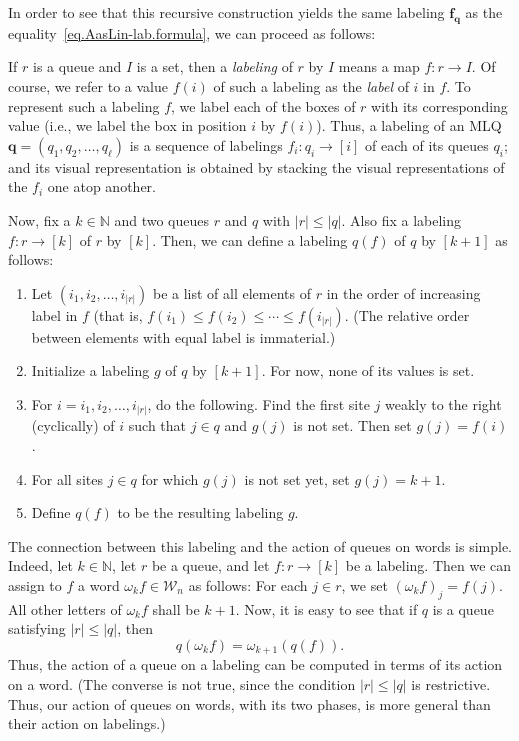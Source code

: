 \documentclass[reqno]{amsart}
\newcommand{\0}{\phantom{c}}
\newcommand{\ff}{\mathbf{f}}
\newcommand{\qq}{\mathbf{q}}
\newcommand{\mcW}{\mathcal{W}}
\newcommand{\NN}{\mathbb{N}}
\newenvironment{verlong}{}{}
\newcommand{\abs}[1]{\left| #1 \right|}
\newcommand{\tup}[1]{\left( #1 \right)}
\newcommand{\ive}[1]{\left[ #1 \right]}
\newcommand{\defn}[1]{{\color{darkred}\emph{#1}}} %
\theoremstyle{plain}
\theoremstyle{definition}
\numberwithin{equation}{section}
\begin{document}
\begin{verlong}
In order to see that this recursive construction yields the same labeling $\ff_\qq$ as the equality~\eqref{eq.AasLin-lab.formula}, we can proceed as follows:

If $r$ is a queue and $I$ is a set, then a \defn{labeling} of $r$ by $I$ means a map $f \colon r \to I$.
Of course, we refer to a value $f \tup{i}$ of such a labeling as the \defn{label} of $i$ in $f$.
To represent such a labeling $f$, we label each of the boxes of $r$ with its corresponding value (i.e., we label the box in position $i$ by $f\tup{i}$).
Thus, a labeling of an MLQ $\qq = (q_1, q_2, \dotsc, q_{\ell})$ is a sequence of labelings $f_i \colon q_i \to \ive{i}$ of each of its queues $q_i$; and its visual representation is obtained by stacking the visual representations of the $f_i$ one atop another.

Now, fix a $k \in \NN$ and two queues $r$ and $q$ with $\abs{r} \leq \abs{q}$. Also fix a labeling $f \colon r \to \ive{k}$ of $r$ by $\ive{k}$.
Then, we can define a labeling \defn{$q(f)$} of $q$ by $\ive{k+1}$ as follows:
\begin{enumerate}
\item Let $\tup{i_1, i_2, \ldots, i_{\abs{r}}}$ be a list of all elements of $r$ in the order of increasing label in $f$ (that is, $f(i_1) \leq f(i_2) \leq \cdots \leq f(i_{\abs{r}})$.
 (The relative order between elements with equal label is immaterial.)

\item Initialize a labeling $g$ of $q$ by $\ive{k+1}$. For now, none of its values is set.

\item For $i = i_1, i_2, \ldots, i_{\abs{r}}$, do the following.
    Find the first site $j$ weakly to the right (cyclically) of $i$ such that $j \in q$ and $g\tup{j}$ is not set.
    Then set $g\tup{j} = f\tup{i}$.

\item For all sites $j \in q$ for which $g \tup{j}$ is not set yet, set $g \tup{j} = k+1$.

\item Define $q(f)$ to be the resulting labeling $g$.
\end{enumerate}

The connection between this labeling and the action of queues on words is simple.
Indeed, let $k \in \NN$, let $r$ be a queue, and let $f \colon r \to \ive{k}$ be a labeling.
Then we can assign to $f$ a word $\omega_k f \in \mcW_n$ as follows:
For each $j \in r$, we set $\tup{\omega_k f}_j = f \tup{j}$.
All other letters of $\omega_k f$ shall be $k+1$.
Now, it is easy to see that if $q$ is a queue satisfying $\abs{r} \leq \abs{q}$, then
\begin{equation}
q \tup{ \omega_k f } = \omega_{k+1} \tup{ q(f) } .
\label{eq.AasLin-lab.two-actions}
\end{equation}
Thus, the action of a queue on a labeling can be computed in terms of its action on a word.
(The converse is not true, since the condition $\abs{r} \leq \abs{q}$ is restrictive.
Thus, our action of queues on words, with its two phases, is more general than their
action on labelings.)


\end{verlong}
\end{document}
